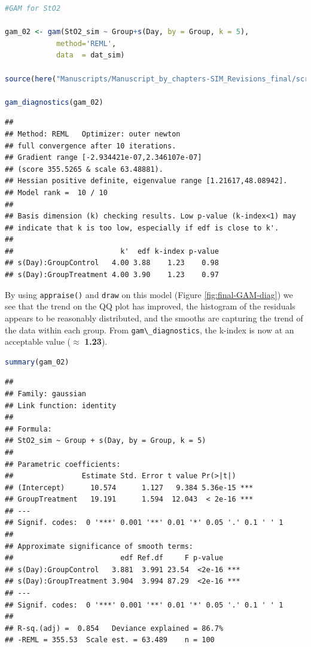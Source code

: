 \documentclass[
]{article}
\newcommand{\passthrough}[1]{#1}
\begin{document}
\begin{lstlisting}[language=R]
#GAM for StO2

gam_02 <- gam(StO2_sim ~ Group+s(Day, by = Group, k = 5),
            method='REML',
            data  = dat_sim)

source(here("Manuscripts/Manuscript_by_chapters-SIM_Revisions_final/scripts","gam_diagnostics.R"))

gam_diagnostics(gam_02)
\end{lstlisting}

\begin{lstlisting}
## 
## Method: REML   Optimizer: outer newton
## full convergence after 10 iterations.
## Gradient range [-2.934421e-07,2.346107e-07]
## (score 355.5265 & scale 63.48881).
## Hessian positive definite, eigenvalue range [1.21617,48.08942].
## Model rank =  10 / 10 
## 
## Basis dimension (k) checking results. Low p-value (k-index<1) may
## indicate that k is too low, especially if edf is close to k'.
## 
##                         k'  edf k-index p-value
## s(Day):GroupControl   4.00 3.88    1.23    0.98
## s(Day):GroupTreatment 4.00 3.90    1.23    0.97
\end{lstlisting}

By using \passthrough{\lstinline!appraise()!} and \passthrough{\lstinline!draw!} on this model (Figure \ref{fig:final-GAM-diag}) we see that the trend on the QQ plot has improved, the histogram of the residuals appears to be reasonably distributed, and the smooths are capturing the trend of the data within each group. From \passthrough{\lstinline!gam\_diagnostics!}, the k-index is now at an acceptable value (\(\approx\) \textbf{1.23}).

\begin{lstlisting}[language=R]
summary(gam_02)
\end{lstlisting}

\begin{lstlisting}
## 
## Family: gaussian 
## Link function: identity 
## 
## Formula:
## StO2_sim ~ Group + s(Day, by = Group, k = 5)
## 
## Parametric coefficients:
##                Estimate Std. Error t value Pr(>|t|)    
## (Intercept)      10.574      1.127   9.384 5.36e-15 ***
## GroupTreatment   19.191      1.594  12.043  < 2e-16 ***
## ---
## Signif. codes:  0 '***' 0.001 '**' 0.01 '*' 0.05 '.' 0.1 ' ' 1
## 
## Approximate significance of smooth terms:
##                         edf Ref.df     F p-value    
## s(Day):GroupControl   3.881  3.991 23.54  <2e-16 ***
## s(Day):GroupTreatment 3.904  3.994 87.29  <2e-16 ***
## ---
## Signif. codes:  0 '***' 0.001 '**' 0.01 '*' 0.05 '.' 0.1 ' ' 1
## 
## R-sq.(adj) =  0.854   Deviance explained = 86.7%
## -REML = 355.53  Scale est. = 63.489    n = 100
\end{lstlisting}
\end{document}
